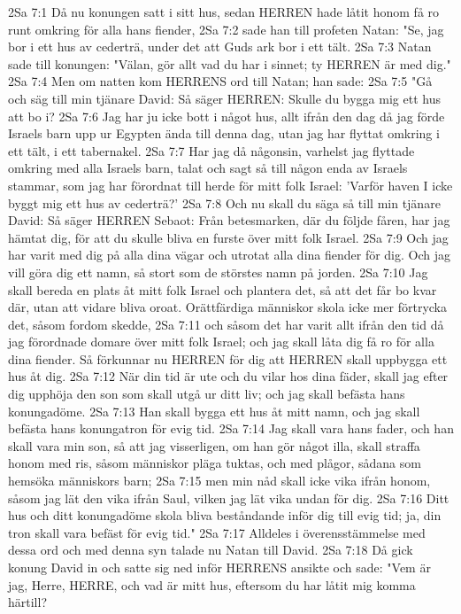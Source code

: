 2Sa 7:1  Då nu konungen satt i sitt hus, sedan HERREN hade låtit honom få ro runt omkring för alla hans fiender,
2Sa 7:2  sade han till profeten Natan: "Se, jag bor i ett hus av cederträ, under det att Guds ark bor i ett tält.
2Sa 7:3  Natan sade till konungen: "Välan, gör allt vad du har i sinnet; ty HERREN är med dig."
2Sa 7:4  Men om natten kom HERRENS ord till Natan; han sade:
2Sa 7:5  "Gå och säg till min tjänare David: Så säger HERREN: Skulle du bygga mig ett hus att bo i?
2Sa 7:6  Jag har ju icke bott i något hus, allt ifrån den dag då jag förde Israels barn upp ur Egypten ända till denna dag, utan jag har flyttat omkring i ett tält, i ett tabernakel.
2Sa 7:7  Har jag då någonsin, varhelst jag flyttade omkring med alla Israels barn, talat och sagt så till någon enda av Israels stammar, som jag har förordnat till herde för mitt folk Israel: 'Varför haven I icke byggt mig ett hus av cederträ?'
2Sa 7:8  Och nu skall du säga så till min tjänare David: Så säger HERREN Sebaot: Från betesmarken, där du följde fåren, har jag hämtat dig, för att du skulle bliva en furste över mitt folk Israel.
2Sa 7:9  Och jag har varit med dig på alla dina vägar och utrotat alla dina fiender för dig. Och jag vill göra dig ett namn, så stort som de störstes namn på jorden.
2Sa 7:10  Jag skall bereda en plats åt mitt folk Israel och plantera det, så att det får bo kvar där, utan att vidare bliva oroat. Orättfärdiga människor skola icke mer förtrycka det, såsom fordom skedde,
2Sa 7:11  och såsom det har varit allt ifrån den tid då jag förordnade domare över mitt folk Israel; och jag skall låta dig få ro för alla dina fiender. Så förkunnar nu HERREN för dig att HERREN skall uppbygga ett hus åt dig.
2Sa 7:12  När din tid är ute och du vilar hos dina fäder, skall jag efter dig upphöja den son som skall utgå ur ditt liv; och jag skall befästa hans konungadöme.
2Sa 7:13  Han skall bygga ett hus åt mitt namn, och jag skall befästa hans konungatron för evig tid.
2Sa 7:14  Jag skall vara hans fader, och han skall vara min son, så att jag visserligen, om han gör något illa, skall straffa honom med ris, såsom människor pläga tuktas, och med plågor, sådana som hemsöka människors barn;
2Sa 7:15  men min nåd skall icke vika ifrån honom, såsom jag lät den vika ifrån Saul, vilken jag lät vika undan för dig.
2Sa 7:16  Ditt hus och ditt konungadöme skola bliva beståndande inför dig till evig tid; ja, din tron skall vara befäst för evig tid."
2Sa 7:17  Alldeles i överensstämmelse med dessa ord och med denna syn talade nu Natan till David.
2Sa 7:18  Då gick konung David in och satte sig ned inför HERRENS ansikte och sade: "Vem är jag, Herre, HERRE, och vad är mitt hus, eftersom du har låtit mig komma härtill?
